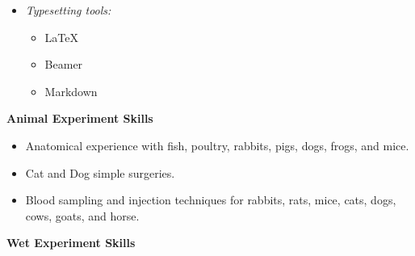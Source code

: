 \begin{multicols}{3}
\begin{itemize}
    \item \textit{Typesetting tools:}  
    \begin{itemize}  
        \item \LaTeX
        \item Beamer
        \item Markdown
    \end{itemize} 
\end{itemize}  
  
\end{multicols} %


\textbf{Animal Experiment Skills}

\begin{itemize}
    \item Anatomical experience with fish, poultry, rabbits, pigs, dogs, frogs, and mice.
    \item Cat and Dog simple surgeries.
    \item Blood sampling and injection techniques for rabbits, rats, mice, cats, dogs, cows, goats, and horse.
\end{itemize}


\textbf{Wet Experiment Skills}

